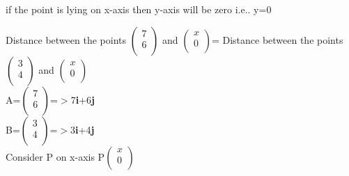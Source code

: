\documentclass[journal,10pt,twocolumn]{article}
\begin{document}
if the point is lying on x-axis then y-axis will be zero i.e.. y=0


Distance between the points $\begin{pmatrix}
  7 \\
  6 \\
 \end{pmatrix}$ and $\begin{pmatrix}
  x \\
  0 \\
 \end{pmatrix}$= Distance between the points $\begin{pmatrix}
  3 \\
  4 \\
 \end{pmatrix}$ and $\begin{pmatrix}
  x \\
  0 \\
 \end{pmatrix}$\\ 	
A=$\begin{pmatrix}
  7 \\
  6 \\
 \end{pmatrix}$=$>$7\textbf{i}+6\textbf{j}\\     \vspace{0.5mm}
B=$\begin{pmatrix}
  3 \\
  4 \\
 \end{pmatrix}$=$>$3\textbf{i}+4\textbf{j}\\      

Consider P on x-axis P$\begin{pmatrix}
  x \\
  0 \\
 \end{pmatrix}$           \vspace{3mm}
\end{document}
